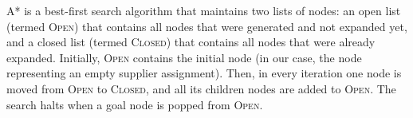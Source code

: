 \documentclass[letterpaper]{article} %
\newcommand{\tuple}[1]{\langle#1\rangle}
\newcommand{\samd}{\ac{SAMD}\xspace}
\newcommand{\astar}{\textsc{A*}\xspace}
\newcommand{\closed}{\textsc{Closed}\xspace}
\newcommand{\open}{\textsc{Open}\xspace}
\newcommand{\commentout}[1]{}
\begin{document}
\commentout{
\begin{algorithm}
\small
\KwIn{$\Pi=\tuple{T,S,X,d}$, an \samd problem}
\KwOut{$\varphi$, an optimal supplier assignment}
    $M_{best}\gets 0$; $\varphi_{best}\gets$ null; $\varphi_{init}=\{\}$; \open $\gets \emptyset$\\
    $n_{init}$.task$\gets 0$; $n_{init}$.$\varphi\gets \varphi_{init}$\\
    Add $n_{init}$ to \open with key $U(n_{init})$\\
    \While{\open is not empty}{
        $n_{best}\gets$ pop from \open a node with maximal $U(n)$\\
        \If{$U(n_{best})\leq M_{best}$}{
            \Return $\varphi_{best}$\\
        }
        $i\gets n_{best}$.task\\
        $\varphi\gets n_{best}.\varphi$\\
        \ForEach{supplier $s$ for task $t_{i+1}$}{
            $n_{child}$.task $\gets i+1$\\    $n_{child}.\varphi\gets\varphi\cup(t_i\rightarrow s)$\\
            \eIf{$n_{child}.\varphi$ is a complete assignment}{
                $M\gets M(n_{child})$\\
                \If{$M\geq M_{best}$}{
                    $M_{best}\gets M$\\
                    $\varphi_{best}\gets n_{child}.\varphi$\\
                }
            }{
                Add $n_{child}$ to \open with key $U(n_{child})$\\
            }
        }
    }
    \Return $\varphi_{best}$\\
    \caption{Psuedo-code of \astar for \samd.}
	\label{alg:astar}
\end{algorithm}
}

\astar is a best-first search algorithm that maintains two lists of nodes: an open list (termed \open) that contains all nodes that were generated and not expanded yet, and a closed list (termed \closed) that contains all nodes that were already expanded. Initially, \open contains the initial node (in our case, the node representing an empty supplier assignment). Then, in every iteration one node is moved from \open to \closed, and all its children nodes are added to \open. The search halts when a goal node is popped from \open. 
\end{document}
